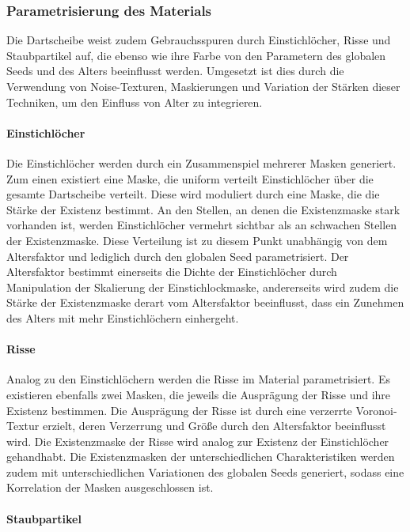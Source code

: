 \subsubsection{Parametrisierung des Materials}

Die Dartscheibe weist zudem Gebrauchsspuren durch Einstichlöcher, Risse und Staubpartikel auf, die ebenso wie ihre Farbe von den Parametern des globalen Seeds und des Alters beeinflusst werden. Umgesetzt ist dies durch die Verwendung von Noise-Texturen, Maskierungen und Variation der Stärken dieser Techniken, um den Einfluss von Alter zu integrieren.

\paragraph{Einstichlöcher}

Die Einstichlöcher werden durch ein Zusammenspiel mehrerer Masken generiert. Zum einen existiert eine Maske, die uniform verteilt Einstichlöcher über die gesamte Dartscheibe verteilt. Diese wird moduliert durch eine Maske, die die Stärke der Existenz bestimmt. An den Stellen, an denen die Existenzmaske stark vorhanden ist, werden Einstichlöcher vermehrt sichtbar als an schwachen Stellen der Existenzmaske. Diese Verteilung ist zu diesem Punkt unabhängig von dem Altersfaktor und lediglich durch den globalen Seed parametrisiert. Der Altersfaktor bestimmt einerseits die Dichte der Einstichlöcher durch Manipulation der Skalierung der Einstichlockmaske, andererseits wird zudem die Stärke der Existenzmaske derart vom Altersfaktor beeinflusst, dass ein Zunehmen des Alters mit mehr Einstichlöchern einhergeht.

\paragraph{Risse}

Analog zu den Einstichlöchern werden die Risse im Material parametrisiert. Es existieren ebenfalls zwei Masken, die jeweils die Ausprägung der Risse und ihre Existenz bestimmen. Die Ausprägung der Risse ist durch eine verzerrte Voronoi-Textur erzielt, deren Verzerrung und Größe durch den Altersfaktor beeinflusst wird. Die Existenzmaske der Risse wird analog zur Existenz der Einstichlöcher gehandhabt. Die Existenzmasken der unterschiedlichen Charakteristiken werden zudem mit unterschiedlichen Variationen des globalen Seeds generiert, sodass eine Korrelation der Masken ausgeschlossen ist.

\paragraph{Staubpartikel}

